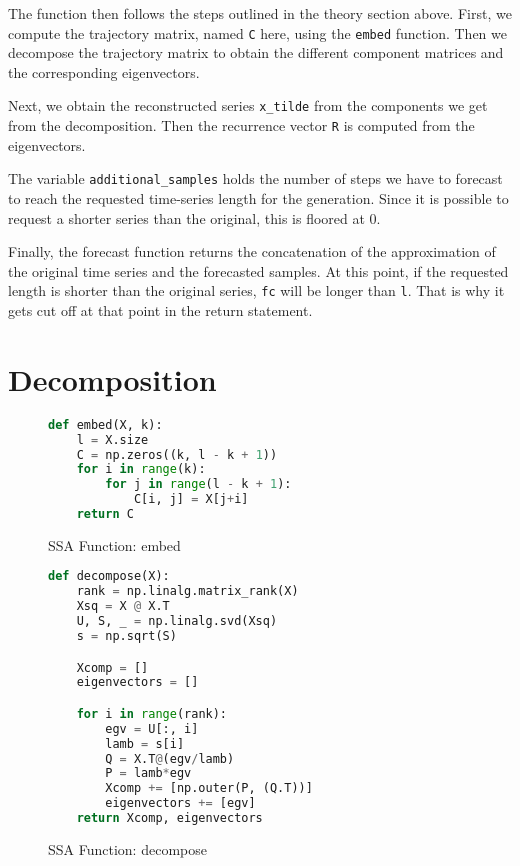 The function then follows the steps outlined in the theory section above. First, we compute the trajectory matrix, named \texttt{C} here, using the \texttt{embed} function. Then we decompose the trajectory matrix to obtain the different component matrices and the corresponding eigenvectors. 

Next, we obtain the reconstructed series \texttt{x\_tilde} from the components we get from the decomposition. Then the recurrence vector \texttt{R} is computed from the eigenvectors. 

The variable \texttt{additional\_samples} holds the number of steps we have to forecast to reach the requested time-series length for the generation. Since it is possible to request a shorter series than the original, this is floored at 0. 

Finally, the forecast function returns the concatenation of the approximation of the original time series and the forecasted samples. At this point, if the requested length is shorter than the original series, \texttt{fc} will be longer than \texttt{l}. That is why it gets cut off at that point in the return statement.

\newpage

\section{Decomposition}

\begin{figure}
\begin{singlespace}
\begin{lstlisting}[language=Python]
def embed(X, k):
    l = X.size
    C = np.zeros((k, l - k + 1))
    for i in range(k):
        for j in range(l - k + 1):
            C[i, j] = X[j+i]
    return C
\end{lstlisting}
\end{singlespace}
\caption{SSA Function: embed}    
\label{fig:ssa-embed}
\end{figure}

\begin{figure}
\begin{singlespace}
\begin{lstlisting}[language=Python]
def decompose(X):
    rank = np.linalg.matrix_rank(X)
    Xsq = X @ X.T
    U, S, _ = np.linalg.svd(Xsq)
    s = np.sqrt(S)

    Xcomp = []
    eigenvectors = []

    for i in range(rank):
        egv = U[:, i]
        lamb = s[i]
        Q = X.T@(egv/lamb)
        P = lamb*egv
        Xcomp += [np.outer(P, (Q.T))]
        eigenvectors += [egv]
    return Xcomp, eigenvectors
\end{lstlisting}
\end{singlespace}
\caption{SSA Function: decompose}    
\label{fig:ssa-decompose}
\end{figure}

